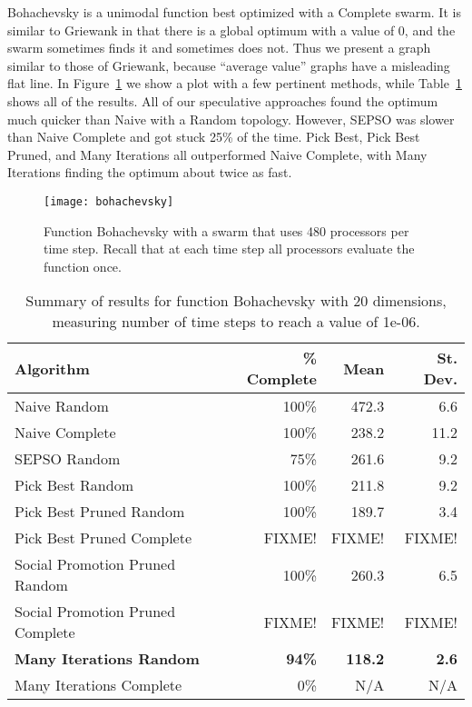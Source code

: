 \documentclass[smallcondensed]{svjour3}
\newcommand{\fig}[1]{Figure~\ref{fig:#1}}
\newcommand{\tabref}[1]{Table~\ref{tab:#1}}
\begin{document}
Bohachevsky is a unimodal function best optimized with a Complete swarm.  It is
similar to Griewank in that there is a global optimum with a value of 0, and
the swarm sometimes finds it and sometimes does not.  Thus we present a graph
similar to those of Griewank, because ``average value'' graphs have a
misleading flat line.  In \fig{bohachevsky} we show a plot with a few pertinent
methods, while \tabref{bohachevsky-20} shows all of the results.  All of our
speculative approaches found the optimum much quicker than Naive with a Random
topology.  However, SEPSO was slower than Naive Complete and got stuck 25\% of
the time.  Pick Best, Pick Best Pruned, and Many Iterations all outperformed
Naive Complete, with Many Iterations finding the optimum about twice as fast.

\begin{figure}
  \centering
  \texttt{[image: bohachevsky]}
  \caption{Function Bohachevsky with a swarm that uses 480 processors per time
  step.  Recall that at each time step all processors evaluate the function
  once.}
  \label{fig:bohachevsky}
\end{figure}

\begin{table}
  \caption{Summary of results for function Bohachevsky with 20 dimensions,
  measuring number of time steps to reach a value of 1e-06.}
  \label{tab:bohachevsky-20}
  \centering
  \begin{tabular}{|l|r|r|r|}
  \hline
  Algorithm&\% Complete&Mean&St. Dev.\\
  \hline
  \hline
  Naive Random&100\%&472.3&6.6\\
  \hline
  Naive Complete&100\%&238.2&11.2\\
  \hline
  SEPSO Random&75\%&261.6&9.2\\
  \hline
  Pick Best Random&100\%&211.8&9.2\\
  \hline
  Pick Best Pruned Random&100\%&189.7&3.4\\
  \hline
  Pick Best Pruned Complete&FIXME!&FIXME!&FIXME!\\
  \hline
  Social Promotion Pruned Random&100\%&260.3&6.5\\
  \hline
  Social Promotion Pruned Complete&FIXME!&FIXME!&FIXME!\\
  \hline
  \textbf{Many Iterations Random}&\textbf{94\%}&\textbf{118.2}&\textbf{2.6}\\
  \hline
  Many Iterations Complete&0\%&N/A&N/A\\
  \hline
  \end{tabular}
\end{table}
\end{document}
